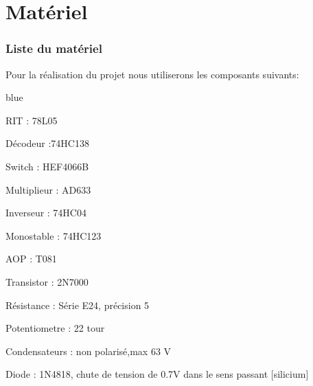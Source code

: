 
\chapter{Matériel}
\subsection{Liste du matériel}


Pour la réalisation du projet nous utiliserons les composants suivants:

\begin{items}{blue}{\Bullet}
    \item RIT : 78L05
    \item Décodeur :74HC138
    \item Switch : HEF4066B
    \item Multiplieur : AD633
    \item Inverseur : 74HC04
    \item Monostable : 74HC123
    \item AOP : T081
    \item Transistor : 2N7000
    \item Résistance : Série E24,  précision 5%
    \item Potentiometre : 22 tour
    \item Condensateurs : non polarisé,max 63 V 
    \item Diode : 1N4818, chute de tension de 0.7V dans le sens passant [silicium]
\end{items}




